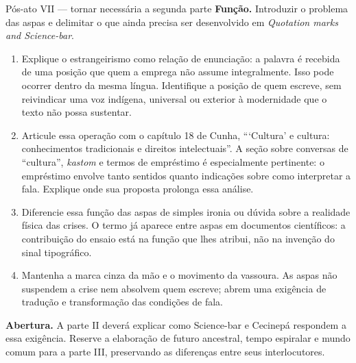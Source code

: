 \begin{orientacao}{Pós-ato VII --- tornar necessária a segunda parte}
\textbf{Função.} Introduzir o problema das aspas e delimitar o que ainda
precisa ser desenvolvido em \textit{Quotation marks and Science-bar}.
\begin{enumerate}
\item Explique o estrangeirismo como relação de enunciação: a palavra
é recebida de uma posição que quem a emprega não assume integralmente.
Isso pode ocorrer dentro da mesma língua. Identifique a posição
de quem escreve, sem reivindicar uma voz indígena, universal ou
exterior à modernidade que o texto não possa sustentar.
\item Articule essa operação com o capítulo 18 de Cunha,
\enquote{\enquote{Cultura} e cultura: conhecimentos tradicionais e
direitos intelectuais}. A seção sobre conversas de \enquote{cultura},
\textit{kastom} e termos de empréstimo é especialmente pertinente:
o empréstimo envolve tanto sentidos quanto indicações sobre como
interpretar a fala. Explique onde sua proposta prolonga essa análise.
\item Diferencie essa função das aspas de simples ironia ou dúvida
sobre a realidade física das crises. O termo já aparece entre aspas
em documentos científicos: a contribuição do ensaio está na função
que lhes atribui, não na invenção do sinal tipográfico.
\item Mantenha a marca cinza da mão e o movimento da vassoura.
As aspas não suspendem a crise nem absolvem quem escreve; abrem
uma exigência de tradução e transformação das condições de fala.
\end{enumerate}
\textbf{Abertura.} A parte II deverá explicar como Science-bar e
Cecinepá respondem a essa exigência. Reserve a elaboração de futuro
ancestral, tempo espiralar e mundo comum para a parte III, preservando
as diferenças entre seus interlocutores.
\end{orientacao}
